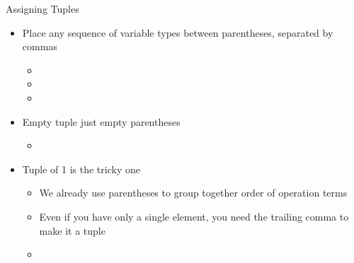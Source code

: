 \documentclass[pdf, aspectratio=169, 12pt]{beamer}
\begin{document}
\begin{frame}{Assigning Tuples}
	\begin{itemize}
		\item<+-> Place any sequence of variable types between parentheses, separated by commas
			\begin{itemize}
				\item {}
				\item {}
				\item {}
			\end{itemize}
		\item<+-> Empty tuple just empty parentheses
			\begin{itemize}
				\item {}
			\end{itemize}
		\item<+-> Tuple of 1 is the tricky one
			\begin{itemize}
				\item We already use parentheses to group together order of operation terms
				\item Even if you have only a single element, you \alert{need the trailing comma} to make it a tuple
				\item {}
			\end{itemize}
	\end{itemize}
\end{frame}
\end{document}
